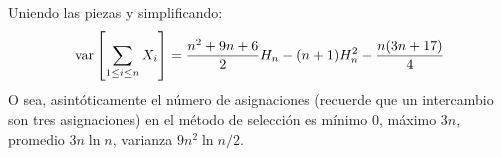   Uniendo las piezas y simplificando:
  \begin{equation}
    \operatorname{var}\left[ \sum_{1 \le i \le n} X_i \right]
      = \frac{n^2 + 9 n + 6}{2} H_n
          - (n + 1) H_n^2
          - \frac{n (3 n + 17)}{4}
  \end{equation}
  O sea,
  asintóticamente el número de asignaciones
  (recuerde que un intercambio son tres asignaciones)
  en el método de selección
  es mínimo \num{0}, máximo \(3 n\), promedio \(3 n \ln n\),
  varianza \(9 n^2 \ln n / 2\).





